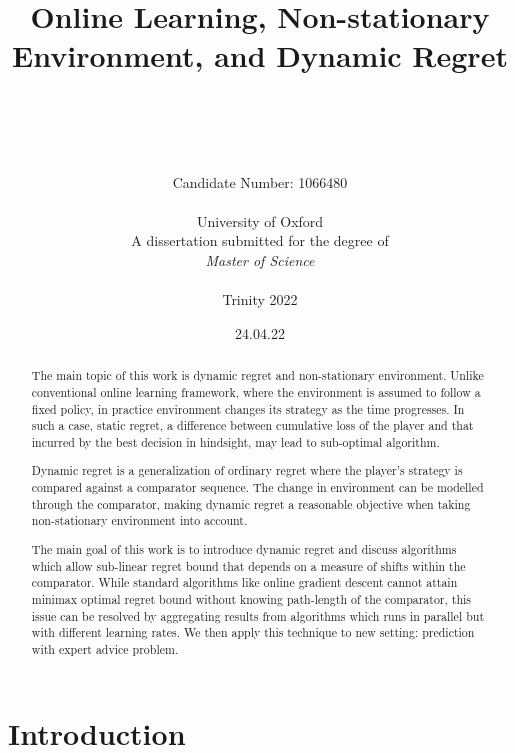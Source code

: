 \documentclass[12pt, a4paper]{report}
\date{24.04.22}
\title{Online Learning, Non-stationary Environment, and Dynamic Regret}
\author{\\ %
\\
\\
\\ Candidate Number: 1066480
\\
\\ University of Oxford
\\
A dissertation submitted for the degree of \\ \textit{Master of Science}
\\ \\
Trinity 2022
\\ 
}
\begin{document}
\thispagestyle{headings}
	\maketitle
\FloatBarrier
{}

\thispagestyle{empty}
%
%
\begin{abstract}
The main topic of this work is dynamic regret and non-stationary environment. Unlike conventional online learning framework, where the environment is assumed to follow a fixed policy, in practice environment changes its strategy as the time progresses. In such a case, static regret, a difference between cumulative loss of the player and that incurred by the best decision in hindsight, may lead to sub-optimal algorithm.

Dynamic regret is a generalization of ordinary regret where the player's strategy is compared against a comparator sequence. The change in environment can be modelled through the comparator, making dynamic regret a reasonable objective when taking non-stationary environment into account. 

The main goal of this work is to introduce dynamic regret and discuss algorithms which allow sub-linear regret bound that depends on a measure of shifts within the comparator. While standard algorithms like online gradient descent cannot attain minimax optimal regret bound without knowing path-length of the comparator, this issue can be resolved by aggregating results from algorithms which runs in parallel but with different learning rates. We then apply this technique to new setting: prediction with expert advice problem.

\end{abstract}
\tableofcontents


\chapter{Introduction}
\end{document}
